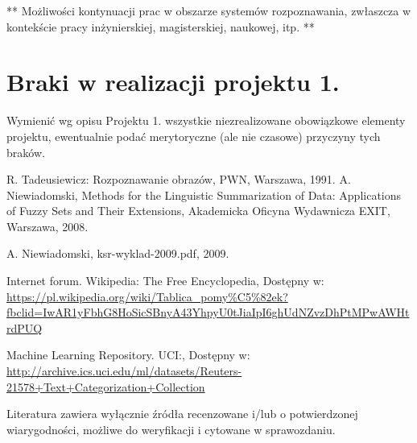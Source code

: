 \documentclass{classrep}
\begin{document}
** Możliwości kontynuacji prac w obszarze systemów rozpoznawania, zwłaszcza w kontekście pracy inżynierskiej,
magisterskiej, naukowej, itp. **\\



\section{Braki w realizacji projektu 1.}
Wymienić wg opisu Projektu 1. wszystkie niezrealizowane obowiązkowe elementy projektu, ewentualnie
podać merytoryczne (ale nie czasowe) przyczyny tych braków. 


\begin{thebibliography}{0}
 R. Tadeusiewicz: Rozpoznawanie obrazów, PWN, Warszawa, 1991.  
 A. Niewiadomski, Methods for the Linguistic Summarization of Data: Applications of Fuzzy Sets and Their Extensions, Akademicka Oficyna Wydawnicza EXIT, Warszawa, 2008.

 A. Niewiadomski, ksr-wyklad-2009.pdf, 2009.

 Internet forum. Wikipedia: The Free Encyclopedia, Dostępny w: \url{https://pl.wikipedia.org/wiki/Tablica_pomy%C5%82ek?fbclid=IwAR1yFbhG8HoSicSBnyA43YhpyU0tJiaIpI6ghUdNZvzDhPtMPwAWHtrdPUQ}

 Machine Learning Repository. UCI:, Dostępny w: \url{http://archive.ics.uci.edu/ml/datasets/Reuters-21578+Text+Categorization+Collection}

\end{thebibliography}

Literatura zawiera wyłącznie źródła recenzowane i/lub o potwierdzonej wiarygodności,
możliwe do weryfikacji i cytowane w sprawozdaniu. 
\end{document}
